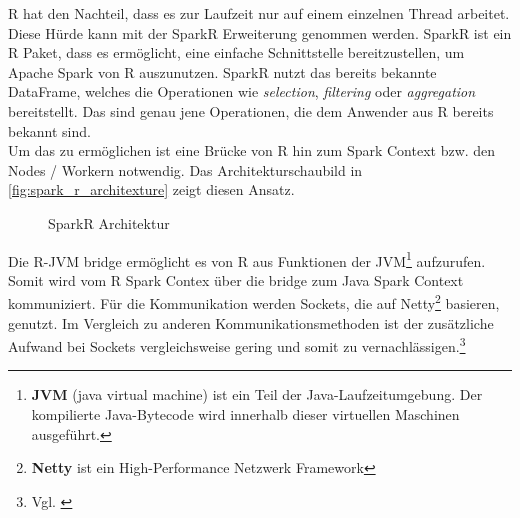 \noindent
R hat den Nachteil, dass es zur Laufzeit nur auf einem einzelnen Thread arbeitet. Diese Hürde kann mit der SparkR Erweiterung genommen werden. SparkR ist ein R Paket, dass es ermöglicht, eine einfache Schnittstelle bereitzustellen, um Apache Spark von R auszunutzen. SparkR nutzt das bereits bekannte DataFrame, welches die Operationen wie \textsl{selection}, \textsl{filtering} oder \textsl{aggregation} bereitstellt. Das sind genau jene Operationen, die dem Anwender aus R bereits bekannt sind. \\

\noindent
Um das zu ermöglichen ist eine Brücke von R hin zum Spark Context bzw. den Nodes / Workern notwendig. Das Architekturschaubild in \autoref{fig:spark_r_architexture} zeigt diesen Ansatz. \\
\begin{figure}[h]
  \centering
  \caption{SparkR Architektur \cite{VYL+16}}\label{fig:spark_r_architexture}
\end{figure}

\noindent
Die R-JVM bridge ermöglicht es von R aus Funktionen der JVM\footnote{\textbf{JVM} (java virtual machine) ist ein Teil der Java-Laufzeitumgebung. Der kompilierte Java-Bytecode wird innerhalb dieser virtuellen Maschinen ausgeführt.} aufzurufen. Somit wird vom R Spark Contex über die bridge zum Java Spark Context kommuniziert. Für die Kommunikation werden Sockets, die auf Netty\footnote{\textbf{Netty} ist ein High-Performance Netzwerk Framework} basieren, genutzt. Im Vergleich zu anderen Kommunikationsmethoden ist der zusätzliche Aufwand bei Sockets vergleichsweise gering und somit zu vernachlässigen.\footnote{Vgl. \cite{VYL+16}} \\

